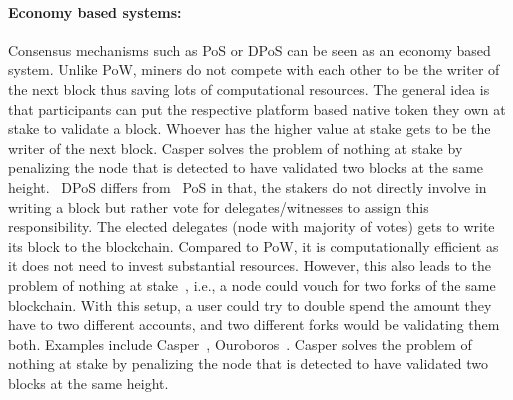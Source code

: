 \paragraph{Economy based systems:}Consensus mechanisms such as \ac{PoS} or
\ac{DPoS} can be seen as an economy based system. Unlike \ac{PoW}, miners do
not compete with each other to be the writer of the next block thus saving lots
of computational resources. The general idea is that participants can put the
respective platform based native token they own at stake to validate a block.
Whoever has the higher value at stake gets to be the writer of the next block.
Casper solves the problem of nothing at stake by penalizing the node that is
detected to have validated two blocks at the same height. ~\ac{DPoS} differs
from ~\ac{PoS} in that, the stakers do not directly involve in writing a block
but rather vote for delegates/witnesses to assign this responsibility. The
elected delegates (node with majority of votes) gets to write its block to the
blockchain. Compared to PoW, it is computationally efficient as it does not
need to invest substantial resources. However, this also leads to the problem
of nothing at stake~\cite{houy2014will}, i.e., a node could vouch for two forks
of the same blockchain. With this setup, a user could try to double spend the
amount they have to two different accounts, and two different forks would be
validating them both. Examples include Casper~\cite{buterin2017casper},
Ouroboros~\cite{kiayias2017ouroboros}. Casper solves the problem of nothing at
stake by penalizing the node that is detected to have validated two blocks at
the same height.  
